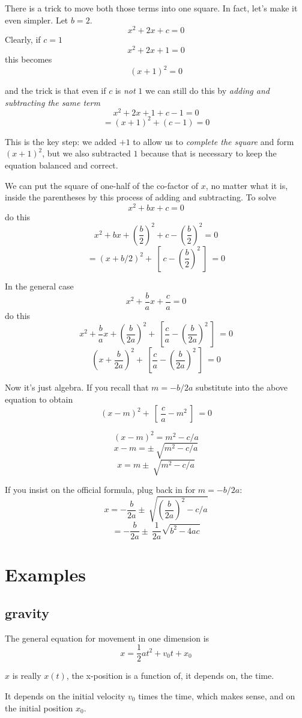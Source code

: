 \documentclass[11pt, oneside]{article}
\begin{document}
There is a trick to move both those terms into one square.  In fact, let's make it even simpler.  Let $b = 2$.
\[ x^2 + 2x + c = 0 \]
Clearly, if $c = 1$ 
\[ x^2 + 2x + 1 = 0 \]
this becomes
\[ (x + 1)^2 = 0 \]

and the trick is that even if $c$ is \emph{not} $1$ we can still do this by \emph{adding and subtracting the same term}
\[ x^2 + 2x + 1 + c - 1 = 0 \]
\[ = (x + 1)^2 + (c - 1) = 0 \]

This is the key step:  we added $+1$ to allow us to \emph{complete the square} and form $(x + 1)^2$, but we also subtracted $1$ because that is necessary to keep the equation balanced and correct.

We can put the square of one-half of the co-factor of $x$, no matter what it is, inside the parentheses by this process of adding and subtracting. To solve
\[ x^2 + bx + c = 0 \]
do this
\[ x^2 + bx + (\frac{b}{2})^2 + c - (\frac{b}{2})^2 = 0 \]
\[ = (x + b/2)^2 + \ [ \ c - (\frac{b}{2})^2 \ ] \  = 0 \]

In the general case 
\[ x^2 + \frac{b}{a}x + \frac{c}{a} = 0 \] 
do this
\[ x^2 + \frac{b}{a}x + (\frac{b}{2a})^2 + \ [ \frac{c}{a} - (\frac{b}{2a})^2 \ ] \ = 0 \]
\[ (x + \frac{b}{2a})^2 + \ [ \frac{c}{a} - (\frac{b}{2a})^2 \ ] \ = 0 \]

Now it's just algebra.  If you recall that $m = -b/2a$ substitute into the above equation to obtain
\[ (x - m)^2 + \ [ \ \frac{c}{a} - m^2 \ ] \ = 0 \]

\[ (x - m)^2 = m^2 - c/a \]
\[ x - m = \pm \ \sqrt{m^2 - c/a} \]
\[ x = m \pm \ \sqrt{m^2 - c/a} \]

If you insist on the official formula, plug back in for $m = -b/2a$:
\[ x = -\frac{b}{2a} \pm \ \sqrt{(\frac{b}{2a})^2 - c/a} \]
\[ = -\frac{b}{2a} \pm \ \frac{1}{2a} \sqrt{b^2 - 4ac} \]

\section*{Examples}

\subsection*{gravity}
The general equation for movement in one dimension is
\[ x = \frac{1}{2}at^2 + v_0 t + x_0 \]

$x$ is really $x(t)$, the x-position is a function of, it depends on, the time.  

It depends on the initial velocity $v_0$ times the time, which makes sense, and on the initial position $x_0$.
\end{document}
